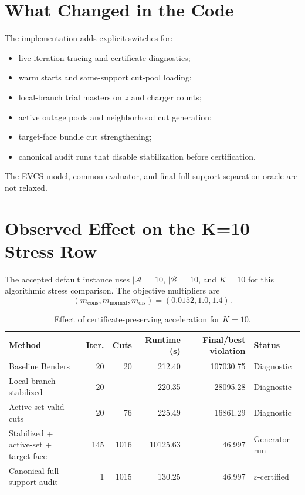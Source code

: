 \documentclass[11pt]{article}
\newcommand{\Aset}{\mathcal A}
\newcommand{\Bset}{\mathcal B}
\newcommand{\eps}{\varepsilon}
\begin{document}
\section{What Changed in the Code}

The implementation adds explicit switches for:
\begin{itemize}
    \item live iteration tracing and certificate diagnostics;
    \item warm starts and same-support cut-pool loading;
    \item local-branch trial masters on $z$ and charger counts;
    \item active outage pools and neighborhood cut generation;
    \item target-face bundle cut strengthening;
    \item canonical audit runs that disable stabilization before certification.
\end{itemize}
The EVCS model, common evaluator, and final full-support separation oracle are
not relaxed.

\section{Observed Effect on the K=10 Stress Row}

The accepted default instance uses $|\Aset|=10$, $|\Bset|=10$, and $K=10$ for
this algorithmic stress comparison.  The objective multipliers are
\[
    (m_{\mathrm{cons}},m_{\mathrm{normal}},m_{\mathrm{dis}})
    =(0.0152,1.0,1.4).
\]

\begin{table}[h]
\centering
\caption{Effect of certificate-preserving acceleration for $K=10$.}
\small
\begin{tabular}{lrrrrl}
\toprule
Method & Iter. & Cuts & Runtime (s) & Final/best violation & Status \\
\midrule
Baseline Benders & 20 & 20 & 212.40 & 107030.75 & Diagnostic \\
Local-branch stabilized & 20 & -- & 220.35 & 28095.28 & Diagnostic \\
Active-set valid cuts & 20 & 76 & 225.49 & 16861.29 & Diagnostic \\
Stabilized + active-set + target-face & 145 & 1016 & 10125.63 & 46.997 & Generator run \\
Canonical full-support audit & 1 & 1015 & 130.25 & 46.997 & $\eps$-certified \\
\bottomrule
\end{tabular}
\label{tab:k10-acceleration}
\end{table}
\end{document}
